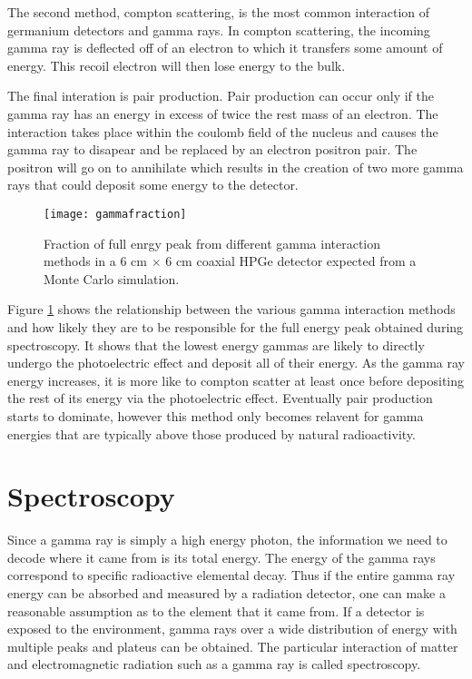 The second method, compton scattering, is the most common interaction of germanium detectors and gamma rays.
In compton scattering, the incoming gamma ray is deflected off of an electron to which it transfers some amount of energy.
This recoil electron will then lose energy to the bulk.

The final interation is pair production.
Pair production can occur only if the gamma ray has an energy in excess of twice the rest mass of an electron.
The interaction takes place within the coulomb field of the nucleus and causes the gamma ray to disapear and be replaced by an electron positron pair.
The positron will go on to annihilate which results in the creation of two more gamma rays that could deposit some energy to the detector.
\begin{figure}[htpb]
\centering
\texttt{[image: gammafraction]}
  \caption{Fraction of full enrgy peak from different gamma interaction methods in a 6 cm $\times$ 6 cm coaxial HPGe detector expected from a Monte Carlo simulation. \cite{Roth1984SegmentationAP}}
\label{fig:gammafraction}
\end{figure}
Figure \ref{fig:gammafraction} shows the relationship between the various gamma interaction methods and how likely they are to be responsible for the full energy peak obtained during spectroscopy.
It shows that the lowest energy gammas are likely to directly undergo the photoelectric effect and deposit all of their energy.
As the gamma ray energy increases, it is more like to compton scatter at least once before depositing the rest of its energy via the photoelectric effect.
Eventually pair production starts to dominate, however this method only becomes relavent for gamma energies that are typically above those produced by natural radioactivity.

\section{Spectroscopy}
Since a gamma ray is simply a high energy photon, the information we need to decode where it came from is its total energy.
The energy of the gamma rays correspond to specific radioactive elemental decay.
Thus if the entire gamma ray energy can be absorbed and measured by a radiation detector, one can make a reasonable assumption as to the element that it came from.
If a detector is exposed to the environment, gamma rays over a wide distribution of energy with multiple peaks and plateus can be obtained.
The particular interaction of matter and electromagnetic radiation such as a gamma ray is called spectroscopy.

